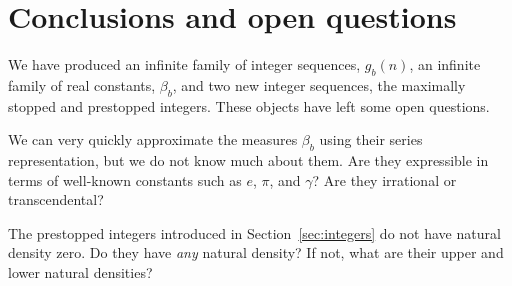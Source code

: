 \documentclass[12pt]{amsart}
\theoremstyle{definition}
\begin{document}
\section{Conclusions and open questions}%
\label{sec:conclusion}

We have produced an infinite family of integer sequences, $g_b(n)$, an infinite
family of real constants, $\beta_b$, and two new integer sequences, the
maximally stopped and prestopped integers. These objects have left some open
questions.

We can very quickly approximate the measures $\beta_b$ using their series
representation, but we do not know much about them. Are they expressible in
terms of well-known constants such as $e$, $\pi$, and $\gamma$? Are they
irrational or transcendental?

The prestopped integers introduced in Section~\ref{sec:integers} do not have
natural density zero. Do they have \emph{any} natural density? If not, what are
their upper and lower natural densities?
\end{document}
